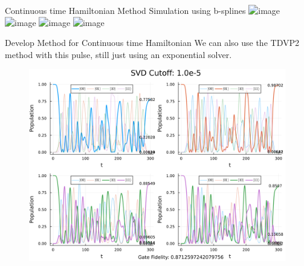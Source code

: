 \documentclass{beamer}
\begin{document}
\begin{frame}{Continuous time Hamiltonian Method}
    Simulation using b-splines 
    \includegraphics<1>[width = 0.9\linewidth]{images/TDVP_B_Spline/TDVP1_BsplineBD4.png}
    \includegraphics<2>[width = 0.9\linewidth]{images/TDVP_B_Spline/TDVP1_BsplineBD3.png}
    \includegraphics<3>[width = 0.9\linewidth]{images/TDVP_B_Spline/TDVP1_BsplineBD2.png}
    \includegraphics<4>[width = 0.9\linewidth]{images/TDVP_B_Spline/TDVP1_BsplineBD1.png}
\end{frame}


\begin{frame}{Develop Method for Continuous time Hamiltonian}
    We can also use the TDVP2 method with this pulse, still just using an exponential solver. 
    \begin{figure}
        \centering
        \includegraphics[width=0.9\linewidth]{images/TDVP2 Tensor Diagram/TDVP2_EvolutionSVD Cutoff_ 1.0e-5(1).png}
        \label{fig:enter-label}
    \end{figure}
\end{frame}
\end{document}
